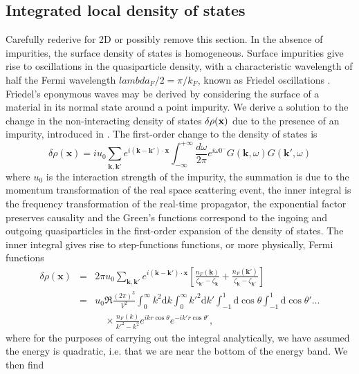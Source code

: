 \subsection{Integrated local density of states}
{\color{red} Carefully rederive for 2D or possibly remove this section.}
In the absence of impurities, the surface density of states is homogeneous. Surface impurities give rise to oscillations in the quasiparticle density, with a characteristic wavelength of half the Fermi wavelength $lambda_F/2 = \pi/k_F$, known as Friedel oscillations \cite{Friedel1958}. Friedel's eponymous waves may be derived by considering the surface of a material in its normal state around a point impurity. We derive a solution to the change in the non-interacting density of states $\delta\rho({\bf x})$ due to the presence of an impurity, introduced in \cite{Carr2009}. The first-order change to the density of states is
\begin{equation}
\delta\rho(\mathbf{x}) = i u_0 \sum_{\mathbf{k}, \mathbf{k'}} e^{i(\mathbf{k}-\mathbf{k'})\cdot\mathbf{x}} \int_{-\infty}^{+\infty} \frac{d\omega}{2\pi} e^{i\omega0^-} G(\mathbf{k},\omega) G(\mathbf{k}',\omega)
\end{equation}
where $u_0$ is the interaction strength of the impurity, the summation is due to the momentum transformation of the real space scattering event, the inner integral is the frequency transformation of the real-time propagator, the exponential factor preserves causality and the Green's functions correspond to the ingoing and outgoing quasiparticles in the first-order expansion of the density of states. The inner integral gives rise to step-functions functions, or more physically, Fermi functions
\begin{eqnarray}
\delta\rho(\mathbf{x}) &=& 2\pi u_0 \sum_{\mathbf{k}, \mathbf{k'}} e^{i(\mathbf{k}-\mathbf{k'})\cdot\mathbf{x}} \left[ 
\frac{n_F(\mathbf{k})}{\zeta_{\mathbf{k}'}-\zeta_\mathbf{k}} + \frac{ n_F(\mathbf{k}')}{\zeta_\mathbf{k}-\zeta_{\mathbf{k}'}}
\right]
\\
&=&
u_0 \Re\frac{(2\pi)^3}{V^2}\int_0^\infty k^2\text{d}k \int_0^\infty k'^2\text{d}k'
\int_{-1}^1 \text{d}\cos{\theta}\int_{-1}^1 \text{d}\cos{\theta'}\dots
\\
& &\quad\times
\frac{ n_F(k)}{k'^2-k^2} e^{ikr\cos{\theta}} e^{-ik'r\cos{\theta'}},
\end{eqnarray}
where for the purposes of carrying out the integral analytically, we have assumed the energy is quadratic, i.e. that we are near the bottom of the energy band. We then find
